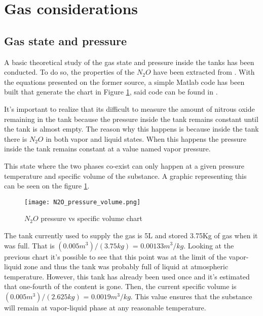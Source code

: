 
\section*{Gas considerations}

\subsection*{Gas state and pressure}

A basic theoretical study of the gas state and pressure inside the tanks has been conducted. To do so, the properties of the $N_2O$ have been extracted from \cite{n2oReference}. With the equations presented on the former source, a simple Matlab code has been built that generate the chart in Figure \ref{fig:N2O_P_V_graph}, said code can be found in \cite{MatlabPVchart}.

It's important to realize that its difficult to measure the amount of nitrous oxide remaining in the tank because the pressure inside the tank remains constant until the tank is almost empty. The reason why this happens is because inside the tank there is $N_2O$ in both vapor and liquid states. When this happens the pressure inside the tank remains constant at a value named vapor pressure.

This state where the two phases co-exist can only happen at a given pressure temperature and specific volume of the substance. A graphic representing this can be seen on the figure \ref{fig:N2O_P_V_graph}.

\begin{figure}[h]
  \centering
  \texttt{[image: N2O\_pressure\_volume.png]}
  \caption{$N_2O$ pressure vs specific volume chart}
  \label{fig:N2O_P_V_graph}
\end{figure}

The tank currently used to supply the gas is 5L and stored 3.75Kg of gas when it was full. That is $(0.005 m^3) / (3.75 kg)$ = $0.00133 m^3/kg$. Looking at the previous chart it's possible to see that this point was at the limit of the vapor-liquid zone and thus the tank was probably full of liquid at atmospheric temperature. However, this tank has already been used once and it's estimated that one-fourth of the content is gone. Then, the current specific volume is $(0.005 m^3) / (2.625 kg)$ = $0.0019 m^3/kg$. This value ensures that the substance will remain at vapor-liquid phase at any reasonable temperature.

